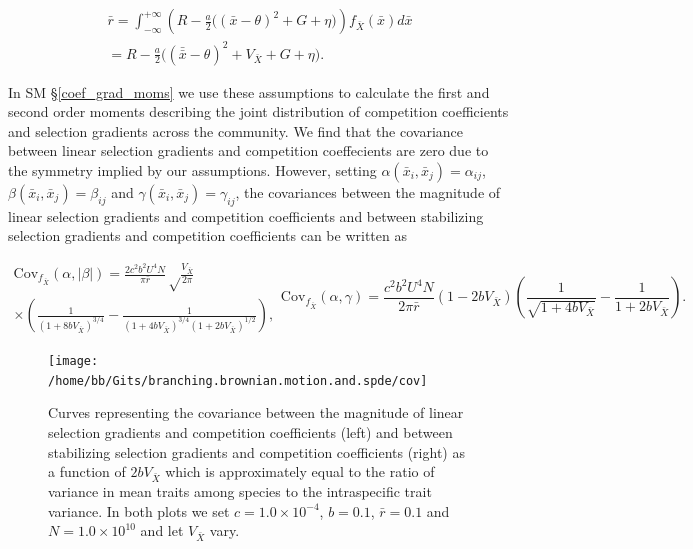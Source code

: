 \documentclass[]{elsarticle} %
\begin{document}
\begin{multline}
\bar r=\int_{-\infty}^{+\infty}\left(R-\frac{a}{2}\Big((\bar x-\theta)^2+G+\eta\Big)\right)f_{\bar X}(\bar x)d\bar x \\
=R-\frac{a}{2}\Big((\bar{\bar x}-\theta)^2+V_{\bar X}+G+\eta\Big).
\end{multline}

In SM \S\ref{coef_grad_moms} we use these assumptions to calculate the
first and second order moments describing the joint distribution of
competition coefficients and selection gradients across the community.
We find that the covariance between linear selection gradients and
competition coeffecients are zero due to the symmetry implied by our
assumptions. However, setting \(\alpha(\bar x_i,\bar x_j)=\alpha_{ij}\),
\(\beta(\bar x_i,\bar x_j)=\beta_{ij}\) and
\(\gamma(\bar x_i,\bar x_j)=\gamma_{ij}\), the covariances between the
magnitude of linear selection gradients and competition coefficients and
between stabilizing selection gradients and competition coefficients can
be written as

\begin{subequations}\label{cov_eqns}
\begin{multline}\label{cov_alpha_beta}
\mathrm{Cov}_{f_{\bar X}}(\alpha,|\beta|)=\frac{2c^2b^2U^4N}{\pi\bar r}\sqrt\frac{V_{\bar X}}{2\pi} \\
\times\left(\frac{1}{(1+8bV_{\bar X})^{3/4}}-\frac{1}{(1+4bV_{\bar X})^{3/4}(1+2bV_{\bar X})^{1/2}}\right),
\end{multline}
\begin{equation}\label{cov_alpha_gamma}
\mathrm{Cov}_{f_{\bar X}}(\alpha,\gamma)=\frac{c^2b^2U^4N}{2\pi\bar r}(1-2bV_{\bar X})\left(\frac{1}{\sqrt{1+4bV_{\bar X}}}-\frac{1}{1+2bV_{\bar X}}\right).
\end{equation}
\end{subequations}

\begin{figure}

{\centering \texttt{[image: /home/bb/Gits/branching.brownian.motion.and.spde/cov]} 

}

\caption{\label{cov_fig}Curves representing the covariance between the magnitude of linear selection gradients and competition coefficients (left) and between stabilizing selection gradients and competition coefficients (right) as a function of $2bV_{\bar X}$ which is approximately equal to the ratio of variance in mean traits among species to the intraspecific trait variance. In both plots we set $c=1.0\times10^{-4}$, $b=0.1$, $\bar r=0.1$ and $N=1.0\times10^{10}$ and let $V_{\bar X}$ vary.}\label{fig:unnamed-chunk-10}
\end{figure}
\end{document}
